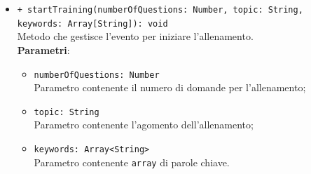 \begin{itemize}
\begin{itemize}
\begin{itemize}
			\end{itemize}
			\item \texttt{+ startTraining(numberOfQuestions: Number, topic: String, \\keywords: Array[String]): void} \\
			Metodo che gestisce l'evento per iniziare l'allenamento. \\
			\textbf{Parametri}:
			\begin{itemize}
				\item \texttt{numberOfQuestions: Number} \\
				Parametro contenente il numero di domande per l'allenamento;
				\item \texttt{topic: String} \\
				Parametro contenente l'agomento dell'allenamento;
				\item \texttt{keywords: Array<String>} \\
				Parametro contenente \texttt{array} di parole chiave.
			\end{itemize}
		\end{itemize}
	\end{itemize}
	
	